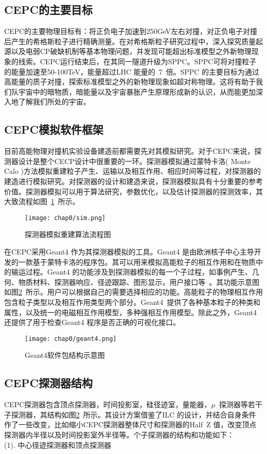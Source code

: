 \subsection{CEPC的主要目标}
CEPC的主要物理目标有：将正负电子加速到250GeV左右对撞，对正负电子对撞后产生的希格斯粒子进行精确测量。在对希格斯粒子研究过程中，深入探究质量起源以及电弱CP破缺机制等基本物理问题，并发现可能超出标准模型之外新物理现象的线索。CEPC运行结束后，在其同一隧道升级为SPPC。SPPC可将对撞粒子的能量加速至50-100TeV，能量超过LHC 能量的~7~倍。SPPC 的主要目标为通过高能量的质子对撞，探索标准模型之外的新物理现象如超对称物理。这将有助于我们队宇宙中的暗物质，暗能量以及宇宙暴胀产生原理形成新的认识，从而能更加深入地了解我们所处的宇宙。\\

\subsection{CEPC模拟软件框架}
目前高能物理对撞机实验设备建造前都需要先对其模拟研究。对于CEPC来说，探测器设计是整个CECP设计中很重要的一环。探测器模拟通过蒙特卡洛( Monte Calo )方法模拟重建粒子产生、运输以及相互作用、相应时间等过程，对探测器的建造进行模拟研究。对探测器的设计和建造来说，探测器模拟具有十分重要的参考价值。探测器模拟可以用于算法研究，参数优化，以及估计探测器的探测效率，其大致流程如图~\ref{fig:sim}~所示。
\begin{figure}[!htb]
  \centering
  \texttt{[image: chap0/sim.png]}
  \caption{探测器模拟重建算法流程图}
  \label{fig:sim}
\end{figure}

在CEPC采用Geant4 作为其探测器模拟的工具。Geant4 是由欧洲核子中心主导开发的一款基于蒙特卡洛的程序包。其可以用来模拟高能粒子的相互作用和在物质中的输运过程。Geant4 的功能涉及到探测器模拟的每一个子过程，如事例产生、几何、物质材料、探测器响应、径迹跟踪、图形显示，用户接口等~\cite{zhuxuezheng}。其功能示意图如图\ref{fig:geant4}~所示。用户可以根据自己的需要选择相应的功能。高能粒子的物理相互作用包含粒子类型以及相互作用类型两个部分。Geant4~提供了各种基本粒子的种类和属性，以及统一的电磁相互作用模型，多种强相互作用模型。除此之外，Geant4 还提供了用于检查Geant4 程序是否正确的可视化接口。
\begin{figure}[!htb]
  \centering
  \texttt{[image: chap0/geant4.png]}
  \caption{Geant4软件包结构示意图}
  \label{fig:geant4}
\end{figure}

\subsection{CEPC探测器结构}
CEPC探测器包含顶点探测器，时间投影室，硅径迹室，量能器，$\mu$~探测器等若干子探测器，其结构如图\ref{fig:geant4}~所示。其设计方案借鉴了ILC 的设计，并结合自身条件作了一些改变，比如缩小CEPC探测器整体尺寸和探测器的Half~Z 值，改变顶点探测器内半径以及时间投影室外半径等。个子探测器的结构和功能如下：\\
(1). 中心径迹探测器和顶点探测器

